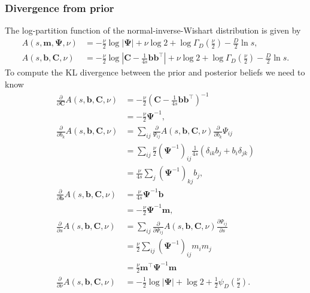 \documentclass[a4paper]{article}
\begin{document}
			\subsubsection*{Divergence from prior}

			The log-partition function of the normal-inverse-Wishart distribution is given by
			\begin{align}
				A(s, \mathbf{m}, \bm{\Psi}, \nu)
				&= -\frac{\nu}{2} \log|\bm{\Psi}| + \nu \log 2 + \log \Gamma_D\left( \frac{\nu}{2} \right) - \frac{D}{2} \ln s, \\
				A(s, \mathbf{b}, \mathbf{C}, \nu)
				&= -\frac{\nu}{2} \log|\mathbf{C} - \frac{1}{4s}\mathbf{b}\mathbf{b}^\top| + \nu \log 2 + \log
				\Gamma_D\left( \frac{\nu}{2} \right) - \frac{D}{2} \ln s.
			\end{align}
			To compute the KL divergence between the prior and posterior beliefs we need to know
			\begin{align}
				\frac{\partial}{\partial \mathbf{C}} A(s, \mathbf{b}, \mathbf{C}, \nu)
				&= -\frac{\nu}{2} (\mathbf{C} - \frac{1}{4s}\mathbf{b}\mathbf{b}^\top)^{-1} \\
				&= -\frac{\nu}{2} \bm{\Psi}^{-1}, \\
				\frac{\partial}{\partial b_k} A(s, \mathbf{b}, \mathbf{C}, \nu)
				&= \sum_{ij} \frac{\partial}{\Psi_{ij}} A(s, \mathbf{b}, \mathbf{C}, \nu) \frac{\partial}{\partial b_k} \Psi_{ij} \\
				&= \sum_{ij} \frac{\nu}{2} (\bm{\Psi}^{-1})_{ij} \frac{1}{4s} (\delta_{ik} b_j + b_i \delta_{jk})  \\
				&= \frac{\nu}{4s}\sum_j (\bm{\Psi}^{-1})_{kj} b_j, \\
				\frac{\partial}{\partial \mathbf{b}} A(s, \mathbf{b}, \mathbf{C}, \nu)
				&= \frac{\nu}{4s}\bm{\Psi}^{-1} \mathbf{b} \\
				&= -\frac{\nu}{2}\bm{\Psi}^{-1} \mathbf{m}, \\
				\frac{\partial}{\partial s} A(s, \mathbf{b}, \mathbf{C}, \nu)
				&= \sum_{ij} \frac{\partial}{\partial \Psi_{ij}} A(s, \mathbf{b}, \mathbf{C}, \nu) \frac{\partial \Psi_{ij}}{\partial s} \\
				&= \frac{\nu}{2} \sum_{ij} (\bm{\Psi}^{-1})_{ij} m_i m_j \\
				&= \frac{\nu}{2} \mathbf{m}^\top \bm{\Psi}^{-1} \mathbf{m} \\
				\frac{\partial}{\partial \nu} A(s, \mathbf{b}, \mathbf{C}, \nu)
				&= -\frac{1}{2} \log|\bm{\Psi}| + \log 2 + \frac{1}{2} \psi_D\left( \frac{\nu}{2} \right).
			\end{align}
\end{document}

